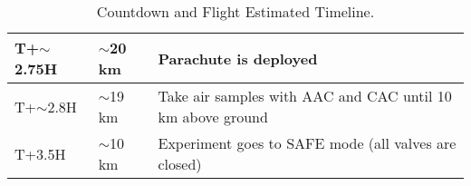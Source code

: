 \begin{table}[H]
\begin{tabular}{|l|l|m{}|}
T+$\sim$2.75H                    & $\sim$20 km                        & Parachute is deployed                                    \\ \hline
T+$\sim$2.8H                     & $\sim$19 km                        & Take air samples with AAC and CAC until 10 km above ground                 \\ \hline
T+3.5H                           & $\sim$10 km                         & Experiment goes to SAFE mode (all valves are closed)                            \\ \hline
\end{tabular}
\caption{Countdown and Flight Estimated Timeline.}
\label{tab:countflight}
\end{table}
\raggedbottom